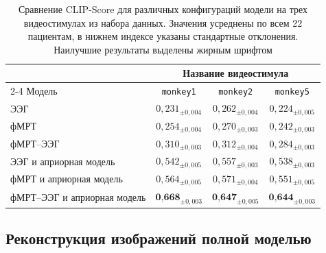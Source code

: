 \begin{table}[h!]
    \centering
    \caption{Сравнение CLIP-Score для различных конфигураций модели на трех видеостимулах из набора данных. Значения усреднены по всем 22 пациентам, в нижнем индексе указаны стандартные отклонения. Наилучшие результаты выделены жирным шрифтом}
    \label{tab:clip_scores}
    \begin{tabular}{lccc}
        \toprule
        & \multicolumn{3}{c}{Название видеостимула} \\
        \cline{2-4}
        Модель & \texttt{monkey1} & \texttt{monkey2} & \texttt{monkey5} \\
        \midrule
        ЭЭГ & $0{,}231_{\pm 0{,}004}$ & $0{,}262_{\pm 0{,}004}$ & $0{,}224_{\pm 0{,}005}$ \\
        фМРТ & $0{,}254_{\pm 0{,}004}$ & $0{,}270_{\pm 0{,}003}$ & $0{,}242_{\pm 0{,}003}$ \\
        фМРТ--ЭЭГ & $0{,}310_{\pm 0{,}003}$ & $0{,}312_{\pm 0{,}004}$ & $0{,}284_{\pm 0{,}003}$ \\
        ЭЭГ и априорная модель & $0{,}542_{\pm 0{,}005}$ & $0{,}557_{\pm 0{,}003}$ & $0{,}538_{\pm 0{,}003}$ \\
        фМРТ и априорная модель & $0{,}564_{\pm 0{,}005}$ & $0{,}571_{\pm 0{,}004}$ & $0{,}551_{\pm 0{,}005}$ \\
        фМРТ--ЭЭГ и априорная модель & $\textbf{0{,}668}_{\pm 0{,}003}$ & $\textbf{0{,}647}_{\pm 0{,}005}$ & $\textbf{0{,}644}_{\pm 0{,}003}$ \\
        \bottomrule
    \end{tabular}
\end{table}

\subsection{Реконструкция изображений полной моделью}\label{sec4:recon}


